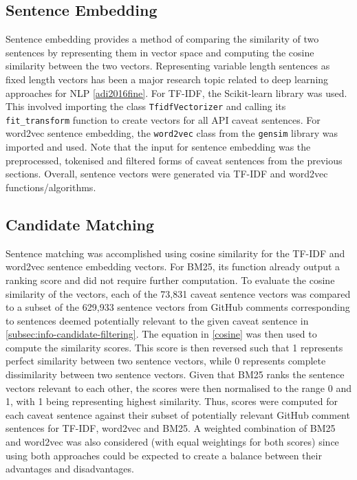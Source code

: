 \subsection{Sentence Embedding}
\label{subsec:info-sentence-embedding}
Sentence embedding provides a method of comparing the similarity of two sentences by representing them in vector space and computing the cosine similarity between the two vectors. Representing variable length sentences as fixed length vectors has been a major research topic related to deep learning approaches for NLP \ref{adi2016fine}.
For TF-IDF, the Scikit-learn library was used. This involved importing the class \lstinline{TfidfVectorizer} and calling its \lstinline{fit_transform} function to create vectors for all API caveat sentences. For word2vec sentence embedding, the \lstinline{word2vec} class from the \lstinline{gensim} library was imported and used. Note that the input for sentence embedding was the preprocessed, tokenised and filtered forms of caveat sentences from the previous sections. Overall, sentence vectors were generated via TF-IDF and word2vec functions/algorithms.

\subsection{Candidate Matching}
\label{subsec:info-candidate-match}
Sentence matching was accomplished using cosine similarity for the TF-IDF and word2vec sentence embedding vectors. For BM25, its function already output a ranking score and did not require further computation. To evaluate the cosine similarity of the vectors, each of the 73,831 caveat sentence vectors was compared to a subset of the 629,933 sentence vectors from GitHub comments corresponding to sentences deemed potentially relevant to the given caveat sentence in \ref{subsec:info-candidate-filtering}. The equation in \ref{cosine} was then used to compute the similarity scores. This score is then reversed such that 1 represents perfect similarity between two sentence vectors, while 0 represents complete dissimilarity between two sentence vectors. Given that BM25 ranks the sentence vectors relevant to each other, the scores were then normalised to the range 0 and 1, with 1 being representing highest similarity.
Thus, scores were computed for each caveat sentence against their subset of potentially relevant GitHub comment sentences for TF-IDF, word2vec and BM25. A weighted combination of BM25 and word2vec was also considered (with equal weightings for both scores) since using both approaches could be expected to create a balance between their advantages and disadvantages. \\


